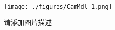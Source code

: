 
\begin{figure}[ht]
\centering
\texttt{[image: ./figures/CamMdl\_1.png]}
\caption{请添加图片描述} \label{CamMdl_fig1}
\end{figure}
